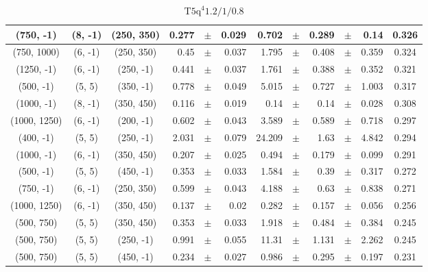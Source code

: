 \documentclass[12pt]{paper}
\newcommand{\TFiveqqqqHM}{\ensuremath{\textrm{T5q}^{4} 1.2/1/0.8}\xspace}
\begin{document}
\begin{table}[ht]
\begin{center}
{\begin{tabular}{|c|c|c|rrr|rrrrr|c|}
(750, -1)&(8, -1)&(250, 350)&0.277&$\pm$&0.029&0.702&$\pm$&0.289&$\pm$&0.14&0.326\\\hline
(750, 1000)&(6, -1)&(250, 350)&0.45&$\pm$&0.037&1.795&$\pm$&0.408&$\pm$&0.359&0.324\\\hline
(1250, -1)&(6, -1)&(250, -1)&0.441&$\pm$&0.037&1.761&$\pm$&0.388&$\pm$&0.352&0.321\\\hline
(500, -1)&(5, 5)&(350, -1)&0.778&$\pm$&0.049&5.015&$\pm$&0.727&$\pm$&1.003&0.317\\\hline
(1000, -1)&(8, -1)&(350, 450)&0.116&$\pm$&0.019&0.14&$\pm$&0.14&$\pm$&0.028&0.308\\\hline
(1000, 1250)&(6, -1)&(200, -1)&0.602&$\pm$&0.043&3.589&$\pm$&0.589&$\pm$&0.718&0.297\\\hline
(400, -1)&(5, 5)&(250, -1)&2.031&$\pm$&0.079&24.209&$\pm$&1.63&$\pm$&4.842&0.294\\\hline
(1000, -1)&(6, -1)&(350, 450)&0.207&$\pm$&0.025&0.494&$\pm$&0.179&$\pm$&0.099&0.291\\\hline
(500, -1)&(5, 5)&(450, -1)&0.353&$\pm$&0.033&1.584&$\pm$&0.39&$\pm$&0.317&0.272\\\hline
(750, -1)&(6, -1)&(250, 350)&0.599&$\pm$&0.043&4.188&$\pm$&0.63&$\pm$&0.838&0.271\\\hline
(1000, 1250)&(6, -1)&(350, 450)&0.137&$\pm$&0.02&0.282&$\pm$&0.157&$\pm$&0.056&0.256\\\hline
(500, 750)&(5, 5)&(350, 450)&0.353&$\pm$&0.033&1.918&$\pm$&0.484&$\pm$&0.384&0.245\\\hline
(500, 750)&(5, 5)&(250, -1)&0.991&$\pm$&0.055&11.31&$\pm$&1.131&$\pm$&2.262&0.245\\\hline
(500, 750)&(5, 5)&(450, -1)&0.234&$\pm$&0.027&0.986&$\pm$&0.295&$\pm$&0.197&0.231\\\hline
\end{tabular}}\end{center}\caption{\TFiveqqqqHM }\end{table}
\end{document}
